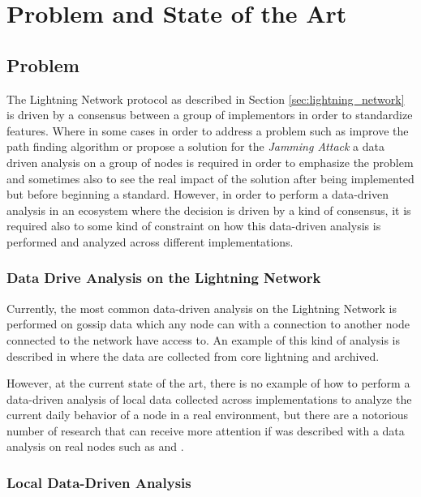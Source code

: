 \chapter{Problem and State of the Art}

\section{Problem}

The Lightning Network protocol as described in Section \ref{sec:lightning_network} is 
driven by a consensus between a group of implementors in order to standardize
features. Where in some cases in order to address a problem such as 
improve the path finding algorithm\cite{DBLP:journals/corr/abs-2103-08576} or 
propose a solution for the \emph{Jamming Attack}\cite{cryptoeprint:2022/1454} 
a data driven analysis on a group of nodes is required in order to emphasize the
problem and sometimes also to see the real impact of the solution after being 
implemented but before beginning a standard.
However, in order to perform a data-driven analysis in an ecosystem where the decision
is driven by a kind of consensus, it is required also to some kind of 
constraint on how this data-driven analysis is performed and analyzed across 
different implementations.

\subsection{Data Drive Analysis on the Lightning Network}

Currently, the most common data-driven analysis on the Lightning Network is performed 
on gossip data which any node can with a connection to another node connected 
to the network have access to. An example of this kind of analysis is described in \cite{lngossip}
where the data are collected from core lightning and archived.

However, at the current state of the art, there is no example of how to perform
a data-driven analysis of local data collected across implementations to 
analyze the current daily behavior of a node in a real environment, but there
are a notorious number of research that can receive more attention if was 
described with a data analysis on real nodes such as \cite{DBLP:journals/corr/abs-2103-08576} 
and \cite{cryptoeprint:2022/1454}.


\subsection{Local Data-Driven Analysis}

